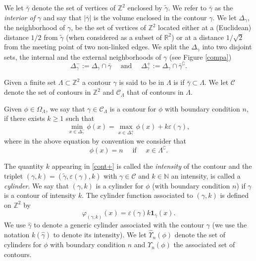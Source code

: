 \documentclass[10pt]{amsart}
\let\mathcal\mathscr
\numberwithin{equation}{section}
\theoremstyle{plain}
\theoremstyle{definition}
\newcommand{\ind}{\mathbf{1}}
\newcommand{\cc}{\complement}
\newcommand{\cC}{{\ensuremath{\mathcal C}} }
\newcommand{\bbN}{{\ensuremath{\mathbb N}} }
\newcommand{\bbR}{{\ensuremath{\mathbb R}} }
\newcommand{\bbZ}{{\ensuremath{\mathbb Z}} }
\newcommand{\gep}{\varepsilon}
\newcommand{\gO}{\Omega}
\newcommand{\gL}{\Lambda}
\begin{document}
We let $\bar \gamma$ denote the set of vertices of $\bbZ^2$ enclosed by $\tilde \gamma$.
We refer to $\bar \gamma$ as the \emph{interior of} $\gamma$ and say that $|\bar \gamma|$ is the volume enclosed in the contour $\gamma$.
We let $\Delta_{\gamma}$, the neighborhood of $\gamma$, be the set of vertices of $\bbZ^2$ located either at a (Euclidean) distance $1/2$ from
$\tilde\gamma$
(when considered as a subset of $\bbR^2$)
or at a distance $1/\sqrt{2}$ from the meeting point of two non-linked edges.
We split the $\Delta_{\gamma}$ into two disjoint sets, the internal and the external neighborhoods of $\gamma$
(see Figure \ref{compa})
\[
\Delta^-_{\gamma}:=\Delta_{\gamma}\cap \bar \gamma \quad \text{ and } \quad \Delta^+_{\gamma}:=\Delta_{\gamma}\cap \bar \gamma^{\cc}.
\]

Given a finite set $\gL\subset \bbZ^2$
a contour $\gamma$ is said to be in $\gL$ is if $\bar \gamma\subset \gL$.
We let $\cC$ denote the set of contours in $\bbZ^2$ and $\cC_{\gL}$ that of contours in $\gL$.

Given $\phi\in \gO_{\gL}$, we say that $\gamma \in \cC_{\gL}$ is a contour
for $\phi$ with boundary condition $n$, if there exists $k\ge 1$ such that
\begin{equation}\label{cont+}
\min_{x\in \Delta^-_{\gamma}} \phi(x)= \max_{x\in \Delta^+_{\gamma}} \phi(x)+k\gep(\gamma),
\end{equation}
where in the above equation by convention we consider that
\[
\phi(x)=n \quad \text{ if } \quad x\in \gL^{\cc}.
\]

The quantity $k$ appearing in \eqref{cont+} is called the \textit{intensity} of the contour and the
triplet $(\gamma,k)=(\tilde \gamma, \gep(\gamma), k)$
with $\gamma \in \cC$ and $k\in \bbN$ an intensity, is called a \textit{cylinder}. We say that $(\gamma,k)$
is a cylinder for $\phi$ (with boundary condition $n$) if $\gamma$ is a contour of intensity $k$.
The cylinder function associated to $(\gamma,k)$ is defined on $\bbZ^2$ by
\begin{equation}\label{cylfunc}
\varphi_{(\gamma,k)}(x)=\gep(\gamma) k \ind_{\bar \gamma}(x).
\end{equation}
We use $\hat \gamma$ to denote a generic cylinder associated with the contour $\gamma$ (we use the notation $k(\hat \gamma)$ to denote its intensity).
We let $\hat \Upsilon_n(\phi)$ denote the set of cylinders for $\phi$ with boundary condition $n$ and $\Upsilon_n(\phi)$ the associated set of contours.
\end{document}
